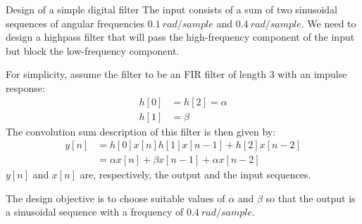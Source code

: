 \documentclass[../../main/main.tex]{subfiles}
\begin{document}
\begin{example}{Design of a simple digital filter}{}
    The input consists of a sum of two sinusoidal sequences of angular frequencies \( 0.1 \ \si{rad/sample} \) and \( 0.4 \ \si{rad/sample} \). We need to design a highpass filter that will pass the high-frequency component of the input but block the low-frequency component.

    For simplicity, assume the filter to be an FIR filter of length 3 with an impulse response:
    \begin{align}
        h[0] &= h[2] = \alpha \\
        h[1] &= \beta
    \end{align}
    The convolution sum description of this filter is then given by:
    \begin{align}
        y[n]
        &=
            h[0]x[n]  h[1]x[n-1] + h[2]x[n-2]   \nonumber   \\
        &=
            \alpha x[n] + \beta x[n-1] + \alpha x[n-2]
    \end{align}
    \( y[n] \) and \( x[n] \) are, respectively, the output and the input sequences.

    The design objective is to choose suitable values of \( \alpha \) and \( \beta \) so that the output is a sinusoidal sequence with a frequency of \( 0.4 \ \si{rad/sample} \).


\end{example}
\end{document}
